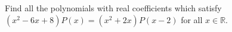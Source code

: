 Find all the polynomials with real coefficients which satisfy $ (x^2-6x+8)P(x)=(x^2+2x)P(x-2)$ for all $x\in \mathbb{R}$.